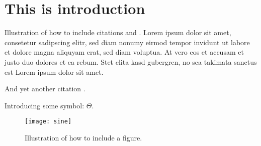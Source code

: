 \chapter{This is introduction}\label{ch:introduction}

\instructionsintroduction


Illustration of how to include citations \cite{Meert2011PhD} and \cite{VandenBroeck2011IJCAI}. Lorem ipsum dolor sit amet, consetetur sadipscing elitr, sed diam nonumy eirmod tempor invidunt ut labore et dolore magna aliquyam erat, sed diam voluptua. At vero eos et accusam et justo duo dolores et ea rebum. Stet clita kasd gubergren, no sea takimata sanctus est Lorem ipsum dolor sit amet.

And yet another citation \cite{FrRo2010Diffusion}.

Introducing some symbol: $\Theta$.


\begin{figure}
  \centering
  \medskip
  \texttt{[image: sine]}
  \caption{Illustration of how to include a figure. }
  \label{fig:sine}
\end{figure}





\cleardoublepage

